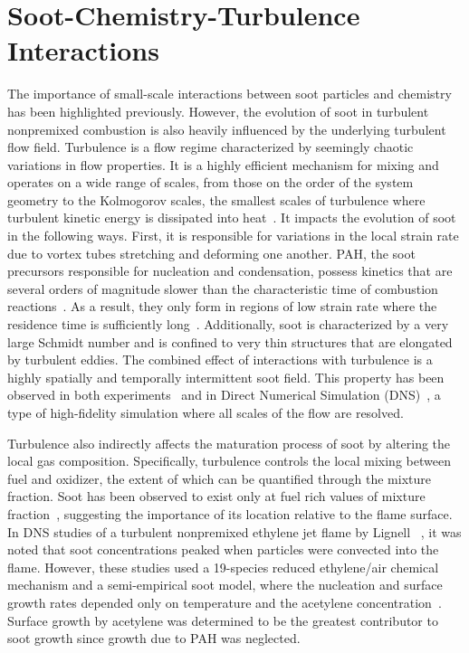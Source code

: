\section{Soot-Chemistry-Turbulence Interactions}
\label{sec:intro:scti}

The importance of small-scale interactions between soot particles and chemistry has been highlighted previously. However, the evolution of soot in turbulent nonpremixed combustion is also heavily influenced by the underlying turbulent flow field. Turbulence is a flow regime characterized by seemingly chaotic variations in flow properties. It is a highly efficient mechanism for mixing and operates on a wide range of scales, from those on the order of the system geometry to the Kolmogorov scales, the smallest scales of turbulence where turbulent kinetic energy is dissipated into heat~\cite{pope2000}. It impacts the evolution of soot in the following ways. First, it is responsible for variations in the local strain rate due to vortex tubes stretching and deforming one another. PAH, the soot precursors responsible for nucleation and condensation, possess kinetics that are several orders of magnitude slower than the characteristic time of combustion reactions~\cite{cuoci2009}. As a result, they only form in regions of low strain rate where the residence time is sufficiently long~\cite{bisetti2012,attili2014,attili2015}. Additionally, soot is characterized by a very large Schmidt number and is confined to very thin structures that are elongated by turbulent eddies. The combined effect of interactions with turbulence is a highly spatially and temporally intermittent soot field. This property has been observed in both experiments~\cite{lee2009,qamar2009,narayanaswamy2013,mahmoud2015} and in Direct Numerical Simulation (DNS)~\cite{lignell2007,lignell2008,bisetti2012,attili2014,attili2015}, a type of high-fidelity simulation where all scales of the flow are resolved.

Turbulence also indirectly affects the maturation process of soot by altering the local gas composition. Specifically, turbulence controls the local mixing between fuel and oxidizer, the extent of which can be quantified through the mixture fraction. Soot has been observed to exist only at fuel rich values of mixture fraction~\cite{bisetti2012,attili2014,mahmoud2015,park2017}, suggesting the importance of its location relative to the flame surface. In DNS studies of a turbulent nonpremixed ethylene jet flame by Lignell \etal~\cite{lignell2007,lignell2008}, it was noted that soot concentrations peaked when particles were convected into the flame. However, these studies used a 19-species reduced ethylene/air chemical mechanism and a semi-empirical soot model, where the nucleation and surface growth rates depended only on temperature and the acetylene concentration~\cite{leung1991}. Surface growth by acetylene was determined to be the greatest contributor to soot growth since growth due to PAH was neglected.

